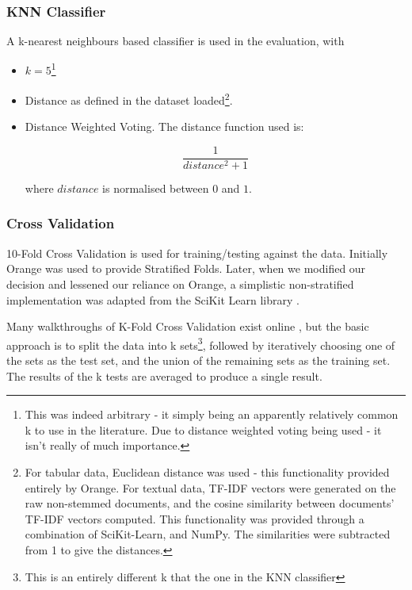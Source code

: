 \documentclass[a4paper,11pt]{report}
\begin{document}
\subsubsection{KNN Classifier}
A k-nearest neighbours based classifier is used in the evaluation, with 
\begin{itemize}
	\item $k=5$\footnote{This was indeed arbitrary - it simply being an apparently relatively common k to use in the literature. Due to distance weighted voting being used - it isn't really of much importance.} 
	\item Distance as defined in the dataset loaded\footnote {For tabular data, Euclidean distance was used - this functionality provided entirely by Orange. For textual data, TF-IDF vectors were generated on the raw non-stemmed documents, and the cosine similarity between documents' TF-IDF vectors computed. This functionality was provided through a combination of SciKit-Learn, and NumPy. The similarities were subtracted from 1 to give the distances. }.
	\item Distance Weighted Voting. The distance function used is:
	
	\[
	\frac{1}{distance^{2}+1}
	\]
	
	where $distance$ is normalised between $0$ and $1$.
	
	
\end{itemize}

\subsubsection{Cross Validation}

10-Fold Cross Validation is used for training/testing against the data. Initially Orange was used to provide Stratified Folds. Later, when we modified our decision and lessened our reliance on Orange, a simplistic non-stratified implementation was adapted from the SciKit Learn library \citep{prog:sklearn}.

Many walkthroughs of K-Fold Cross Validation exist online \citep{web:kfolddemo}, but the basic approach is to split the data into k sets\footnote{This is an entirely different k that the one in the KNN classifier}, followed by iteratively choosing one of the sets as the test set, and the union of the remaining sets as the training set. The results of the k tests are averaged to produce a single result.
\end{document}
